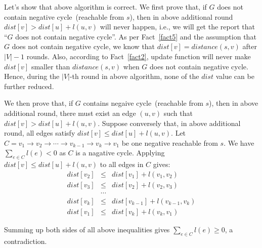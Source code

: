 Let's show that above algorithm is correct.
We first prove that, if $G$ does not contain negative cycle~(reachable from $s$), then in above additional round $dist[v] > dist[u] + l(u,v)$ will never happen,
i.e., we will get the report that ``$G$ does not contain negative cycle''.
As per Fact~\ref{fact5} and the assumption that $G$ does not contain negative cycle, we know that $dist[v] = distance(s,v)$ after $|V| -1 $ rounds.
Also, according to Fact~\ref{fact2}, update function will never make $dist[v]$ smaller than $distance(s,v)$ when $G$ does not contain negative cycle.
Hence, during the $|V|$-th round in above algorithm, none of the $dist$ value can be further reduced.

We then prove that, if $G$ contains negaive cycle~(reachable from $s$), then in above additional round, there must exist an edge $(u,v)$ such that $dist[v] > dist[u] + l(u,v)$.
Suppose conversely that, in above additional round, all edges satisfy $dist[v] \le dist[u] + l(u,v)$.
Let $C = v_1 \to v_2 \to \cdots \to v_{k-1} \to v_k \to v_1$ be one negative reachable from $s$.  We have $\sum_{e\in C} l(e) < 0$ as $C$ is a nagative cycle.
Applying $dist[v] \le dist[u] + l(u,v)$ to all edges in $C$ gives:
\begin{displaymath}
\begin{array}{llllllllllllll}
	dist[v_2] & \le & dist[v_1] + l(v_1, v_2) \\
	dist[v_3] & \le & dist[v_2] + l(v_2, v_3) \\
	& \cdots & \\
	dist[v_k] & \le & dist[v_{k-1}] + l(v_{k-1}, v_k) \\
	dist[v_1] & \le & dist[v_{k}] + l(v_{k}, v_1)
\end{array}
\end{displaymath}

Summing up both sides of all above inequalities gives $\sum_{e\in C} l(e) \ge 0$, a contradiction.

